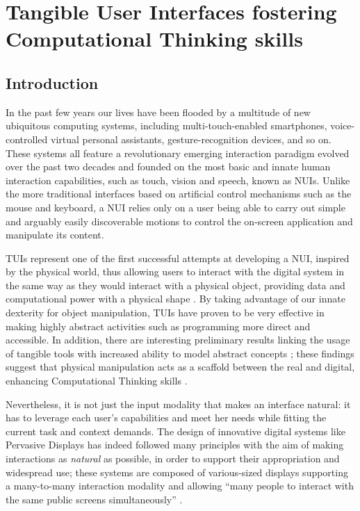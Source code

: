 %
\chapter{Tangible User Interfaces fostering Computational Thinking skills}
\label{sec:tapas}

\section{Introduction}
In the past few years our lives have been flooded by a multitude of new ubiquitous computing systems, including multi-touch-enabled smartphones, voice-controlled virtual personal assistants, gesture-recognition devices, and so on. These systems all feature a revolutionary emerging interaction paradigm evolved over the past two decades and founded on the most basic and innate human interaction capabilities, such as touch, vision and speech, known as \acp{NUI}. Unlike the more traditional interfaces based on artificial control mechanisms such as the mouse and keyboard, a \ac{NUI} relies only on a user being able to carry out simple and arguably easily discoverable motions to control the on-screen application and manipulate its content.

\acp{TUI} represent one of the first successful attempts at developing a \ac{NUI}, inspired by the physical world, thus allowing users to interact with the digital system in the same way as they would interact with a physical object, providing data and computational power with a physical shape . By taking advantage of our innate dexterity for object manipulation, \acp{TUI} have proven to be very effective in making highly abstract activities such as programming more direct and accessible. In addition, there are interesting preliminary results linking the usage of tangible tools with increased ability to model abstract concepts \cite{McNerney:2004jc,Horn:2009be}; 
these findings suggest that physical manipulation acts as a scaffold between the real and digital, enhancing  Computational Thinking skills \cite{Wang:2014jy}.

Nevertheless, it is not just the input modality that makes an interface natural: it has to leverage each user's capabilities and meet her needs while fitting the current task and context demands. The design of innovative digital systems like Pervasive Displays has indeed followed many principles \cite{Wigdor:2011:BNW:1995309} with the aim of making interactions as \emph{natural} as possible, in order to support their appropriation and widespread use; these systems are composed of various-sized displays supporting a many-to-many interaction modality and allowing ``many people to interact with the same public screens simultaneously'' \cite{Terrenghi:2009kr}.

